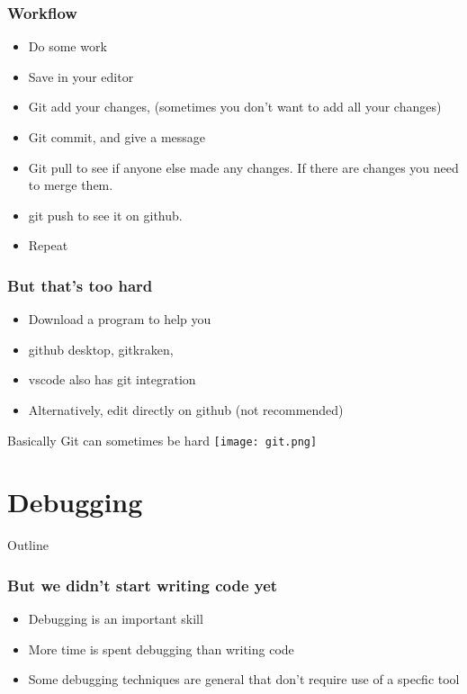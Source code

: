\documentclass[aspectratio=169,hyperref={unicode}]{beamer}
\begin{document}
\begin{frame}
\frametitle{Workflow}
\begin{itemize}
  \item Do some work
        \item Save in your editor
        \item Git add your changes, (sometimes you don't want to add all your changes)
        \item Git commit, and give a message

        \item Git pull to see if anyone else made any changes. If there are changes you need to merge them.
        \item git push to see it on github.
        \item Repeat
\end{itemize}
\end{frame}

\begin{frame}
\frametitle{But that's too hard}
\begin{itemize}
  \item Download a program to help you
        \item github desktop, gitkraken,
        \item vscode also has git integration
        \item  Alternatively, edit directly on github (not recommended)

\end{itemize}
\end{frame}

\begin{frame}{Basically}
  Git can sometimes be hard
\texttt{[image: git.png]}
\end{frame}


\section{Debugging}
\begin{frame}{Outline}
\tableofcontents[currentsection]
\end{frame}

\begin{frame}
\frametitle{But we didn't start writing code yet}
\begin{itemize}
  \item Debugging is an important skill
  \item More time is spent debugging than writing code
        \item Some debugging techniques are general that don't require use of a specfic tool
\end{itemize}
\end{frame}
\end{document}
